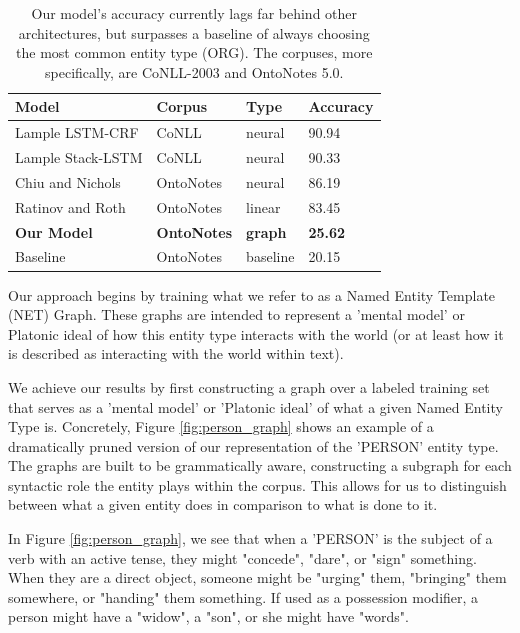 \documentclass[11pt,a4paper]{article}
\begin{document}
\begin{table}[t]
\begin{tabular}{@{}llll@{}}
\toprule
Model              & Corpus          & Type           & Accuracy        \\ \midrule
Lample LSTM-CRF   &  CoNLL   & neural         & 90.94         \\
Lample Stack-LSTM   &  CoNLL   & neural         & 90.33          \\
Chiu and Nichols   & OntoNotes          & neural         & 86.19          \\
Ratinov and Roth   & OntoNotes          & linear         & 83.45          \\ \midrule
\textbf{Our Model} & \textbf{OntoNotes} & \textbf{graph} & \textbf{25.62} \\ \midrule
Baseline           & OntoNotes          & baseline       & 20.15         
\end{tabular}
\label{tab:state_of_art}
\caption{Our model's accuracy currently lags far behind other architectures, but surpasses a baseline of always choosing the most common entity type (ORG). The corpuses, more specifically, are CoNLL-2003 and OntoNotes 5.0.}
\end{table}

Our approach begins by training what we refer to as a Named Entity Template (NET) Graph. These graphs are intended to represent a 'mental model' or Platonic ideal of how this entity type interacts with the world (or at least how it is described as interacting with the world within text).

We achieve our results by first constructing a graph over a labeled training set that serves as a 'mental model' or 'Platonic ideal' of what a given Named Entity Type is. Concretely, Figure \ref{fig:person_graph} shows an example of a dramatically pruned version of our representation of the 'PERSON' entity type. The graphs are built to be grammatically aware, constructing a subgraph for each syntactic role the entity plays within the corpus. This allows for us to distinguish between what a given entity does in comparison to what is done to it.

In Figure \ref{fig:person_graph}, we see that when a 'PERSON' is the subject of a verb with an active tense, they might "concede", "dare", or "sign" something. When they are a direct object, someone might be "urging" them, "bringing" them somewhere, or "handing" them something. If used as a possession modifier, a person might have a "widow", a "son", or she might have "words".
\end{document}
